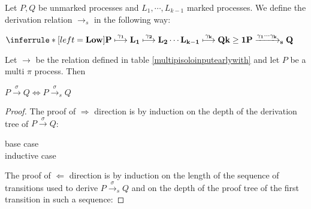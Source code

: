   
\begin{definition}
  Let $P, Q$ be unmarked processes and $L_{1}, \cdots, L_{k-1}$ marked processes. We define the derivation relation $\rightarrow_{s}$ in the following way:
  \begin{center}
    $\inferrule* [left=\bf{Low}]{
	P \stackrel{\gamma_{1}}{\longmapsto} L_{1} \stackrel{\gamma_{2}}{\longmapsto} L_{2} \cdots L_{k-1} \stackrel{\gamma_{k}}{\longmapsto} Q
      \\
	k\geq 1
    }{
      P \xrightarrow{\gamma_{1} \cdots \gamma_{k}}_{s}  Q
    }$
  \end{center}
\end{definition}


\begin{proposition}
  Let $\rightarrow$ be the relation defined in table \ref{multipisoloinputearlywith} and let $P$ be a multi $\pi$ process. Then 
  \begin{center}
    $P\xrightarrow{\sigma} Q \Leftrightarrow P\xrightarrow{\sigma}_{s} Q$
  \end{center}
  \begin{proof}
    The proof of $\Rightarrow$ direction is by induction on the depth of the derivation tree of $P\xrightarrow{\sigma} Q$:
    \begin{description}
      \item[base case]
	
      \item[inductive case]
	
    \end{description}

    
    The proof of $\Leftarrow$ direction is by induction on the length of the sequence of transitions used to derive $P\xrightarrow{\sigma}_{s} Q$ and on the depth of the proof tree of the first transition in such a sequence:
  \end{proof}
\end{proposition}





